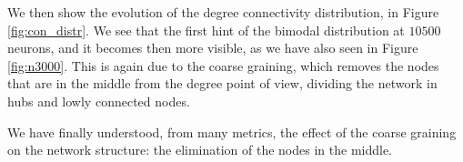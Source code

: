 We then show the evolution of the degree connectivity distribution, in Figure \ref{fig:con_distr}.
We see that the first hint of the bimodal distribution at $10500$ neurons, and it becomes then more 
visible, as we have also seen in Figure \ref{fig:n3000}. This is again due to the coarse graining, which
removes the nodes that are in the middle from the degree point of view, dividing the network in hubs
and lowly connected nodes.

We have finally understood, from many metrics, the effect of the coarse graining on the network structure:
the elimination of the nodes in the middle.